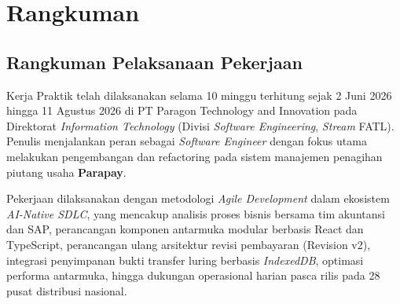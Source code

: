 \chapter{Rangkuman}

\section{Rangkuman Pelaksanaan Pekerjaan}
Kerja Praktik telah dilaksanakan selama 10 minggu terhitung sejak 2 Juni 2026 hingga 11 Agustus 2026 di PT Paragon Technology and Innovation pada Direktorat \textit{Information Technology} (Divisi \textit{Software Engineering}, \textit{Stream} FATL). Penulis menjalankan peran sebagai \textit{Software Engineer} dengan fokus utama melakukan pengembangan dan refactoring pada sistem manajemen penagihan piutang usaha \textbf{Parapay}.

Pekerjaan dilaksanakan dengan metodologi \textit{Agile Development} dalam ekosistem \textit{AI-Native SDLC}, yang mencakup analisis proses bisnis bersama tim akuntansi dan SAP, perancangan komponen antarmuka modular berbasis React dan TypeScript, perancangan ulang arsitektur revisi pembayaran (Revision v2), integrasi penyimpanan bukti transfer luring berbasis \textit{IndexedDB}, optimasi performa antarmuka, hingga dukungan operasional harian pasca rilis pada 28 pusat distribusi nasional.

